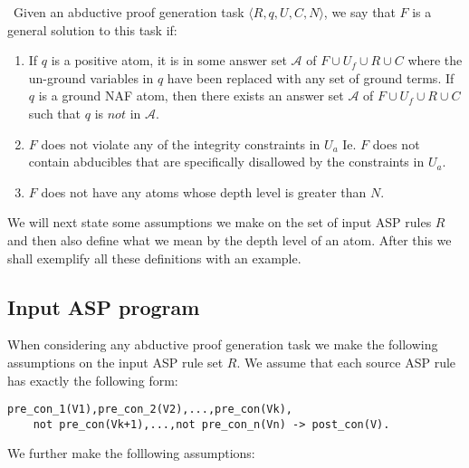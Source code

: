 \begin{definition}\label{def:abductive_proof_generation_task} \
Given an abductive proof generation task $\langle R,q,U,C,N \rangle$, we say that $F$ is a general solution to this task if:
\begin{enumerate}
    \item If $q$ is a positive atom, it is in some answer set $\mathcal{A}$ of $F\cup U_{f}\cup R\cup C$ where the un-ground variables in $q$ have been replaced with any set of ground terms. If $q$ is a ground NAF atom, then there exists an answer set $\mathcal{A}$ of $F\cup U_{f}\cup R\cup C$ such that $q$ is $not$ in $\mathcal{A}$.
    \item $F$ does not violate any of the integrity constraints in $U_{a}$ Ie. $F$ does not contain abducibles that are specifically disallowed by the constraints in $U_{a}$.
    \item $F$ does not have any atoms whose depth level is greater than $N$.
\end{enumerate}
\end{definition} We will next state some assumptions we make on the set of input ASP rules $R$ and then also define what we mean by the depth level of an atom. After this we shall exemplify all these definitions with an example. 
\subsection{Input ASP program}
When considering any abductive proof generation task we make the following assumptions on the input ASP rule set $R$. We assume that each source ASP rule has exactly the following form:
\begin{lstlisting}[frame=none]
pre_con_1(V1),pre_con_2(V2),...,pre_con(Vk),
    not pre_con(Vk+1),...,not pre_con_n(Vn) -> post_con(V).
\end{lstlisting}
We further make the folllowing assumptions:

